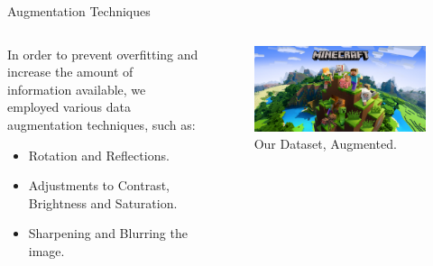 \documentclass[english]{beamer}
\begin{document}
\begin{frame}{Augmentation Techniques}
  \begin{columns}
    
    \begin{column}{0.5\textwidth}
      In order to prevent overfitting and increase the amount of information available, we employed various 
      data augmentation techniques, such as:
      \begin{itemize}
        \item Rotation and Reflections.
        \item Adjustments to Contrast, Brightness and Saturation.
        \item Sharpening and Blurring the image.
      \end{itemize}
    \end{column}

    \begin{column}{0.5\textwidth}
      \begin{figure}
        \centering
            \includegraphics[width=1.0\textwidth]{images/minecraft.jpg}
            \caption{Our Dataset, Augmented.}
        \end{figure}
    \end{column}

  \end{columns}
\end{frame}
\end{document}
